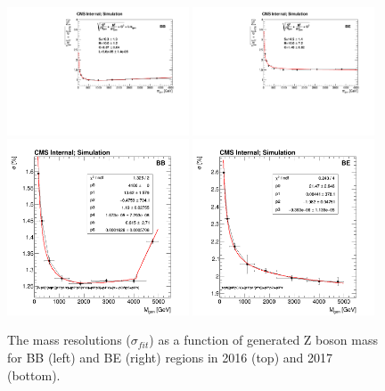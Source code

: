 \begin{figure}[ht]
\centering
\includegraphics[width=0.48\textwidth]{figures/Zprime/2016/mass_resolution/resolution_BB.pdf}
\includegraphics[width=0.48\textwidth]{figures/Zprime/2016/mass_resolution/resolution_BE.pdf}
\includegraphics[width=0.48\textwidth]{figures/Zprime/2017/mass_resolution/High_Mass/BB_sigma}
\includegraphics[width=0.48\textwidth]{figures/Zprime/2017/mass_resolution/High_Mass/BE_sigma}
\caption{The mass resolutions ($\sigma_{fit}$) as a function of generated Z boson mass for BB (left) and BE (right) regions in 2016 (top) \cite{CMS-AN-2016-404} and 2017 (bottom).
 \label{fig:resolution}}
\end{figure}

